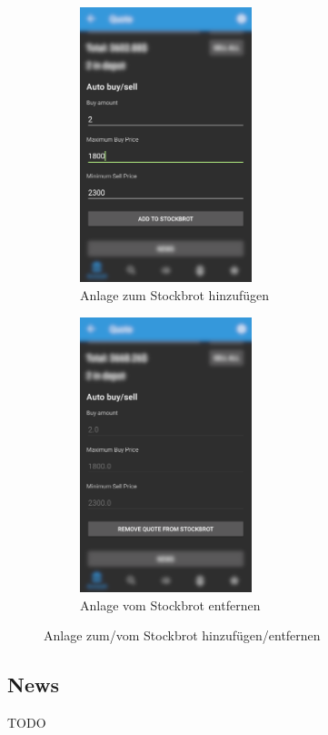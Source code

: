 \documentclass[a4paper]{article}
\begin{document}
\begin{figure}[H]
    \begin{subfigure}{.5\textwidth}
        \centering
        \includegraphics[height=8cm,keepaspectratio]{./images/stockbrot_add_before.png}
        \caption{Anlage zum Stockbrot hinzufügen}
        \label{fig:functionality:stockbrot:add}
    \end{subfigure}
    \begin{subfigure}{.5\textwidth}
        \centering
        \includegraphics[height=8cm,keepaspectratio]{./images/stockbrot_add_after.png}
        \caption{Anlage vom Stockbrot entfernen}
        \label{fig:functionality:stockbrot:remove}
    \end{subfigure}
    \caption{Anlage zum/vom Stockbrot hinzufügen/entfernen}
    \label{fig:functionality:stockbrot:addremove}
\end{figure}


\subsection{News}
\label{subsec:functionality:news}
TODO
\end{document}
